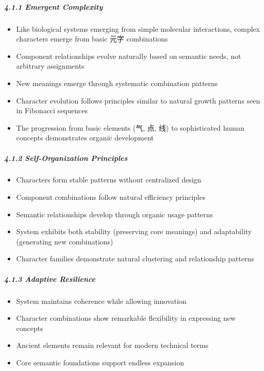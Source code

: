 \subparagraph{4.1.1 Emergent Complexity}\label{emergent-complexity}

\begin{itemize}
\tightlist
\item
  Like biological systems emerging from simple molecular interactions,
  complex characters emerge from basic 元字 combinations
\item
  Component relationships evolve naturally based on semantic needs, not
  arbitrary assignments
\item
  New meanings emerge through systematic combination patterns
\item
  Character evolution follows principles similar to natural growth
  patterns seen in Fibonacci sequences
\item
  The progression from basic elements (气, 点, 线) to sophisticated
  human concepts demonstrates organic development
\end{itemize}

\subparagraph{4.1.2 Self-Organization
Principles}\label{self-organization-principles}

\begin{itemize}
\tightlist
\item
  Characters form stable patterns without centralized design
\item
  Component combinations follow natural efficiency principles
\item
  Semantic relationships develop through organic usage patterns
\item
  System exhibits both stability (preserving core meanings) and
  adaptability (generating new combinations)
\item
  Character families demonstrate natural clustering and relationship
  patterns
\end{itemize}

\subparagraph{4.1.3 Adaptive Resilience}\label{adaptive-resilience}

\begin{itemize}
\tightlist
\item
  System maintains coherence while allowing innovation
\item
  Character combinations show remarkable flexibility in expressing new
  concepts
\item
  Ancient elements remain relevant for modern technical terms
\item
  Core semantic foundations support endless expansion
\end{itemize}

